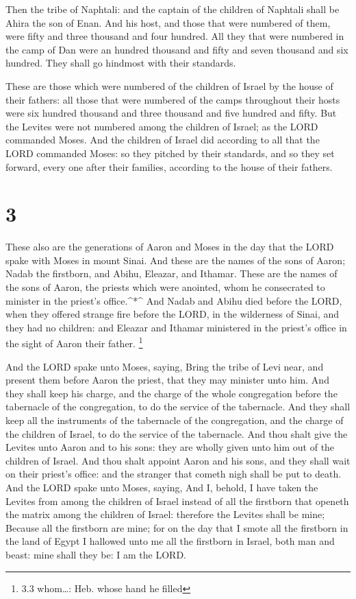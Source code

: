  Then the tribe of Naphtali: and the captain of the
children of Naphtali shall be Ahira the son of Enan.  And
his host, and those that were numbered of them, were fifty and three
thousand and four hundred.  All they that were numbered in
the camp of Dan were an hundred thousand and fifty and seven thousand
and six hundred. They shall go hindmost with their standards.

 These are those which were numbered of the children of
Israel by the house of their fathers: all those that were numbered of
the camps throughout their hosts were six hundred thousand and three
thousand and five hundred and fifty.  But the Levites were
not numbered among the children of Israel; as the LORD commanded Moses.
 And the children of Israel did according to all that the
LORD commanded Moses: so they pitched by their standards, and so they
set forward, every one after their families, according to the house of
their fathers.

\hypertarget{section-2}{%
\section{3}\label{section-2}}

 These also are the generations of Aaron and Moses in the
day that the LORD spake with Moses in mount Sinai.  And
these are the names of the sons of Aaron; Nadab the firstborn, and
Abihu, Eleazar, and Ithamar.  These are the names of the
sons of Aaron, the priests which were anointed, whom he consecrated to
minister in the priest's office.\^{}*\^{}  And Nadab and
Abihu died before the LORD, when they offered strange fire before the
LORD, in the wilderness of Sinai, and they had no children: and Eleazar
and Ithamar ministered in the priest's office in the sight of Aaron
their father. \footnote{3.3 whom\ldots: Heb. whose hand he filled}

 And the LORD spake unto Moses, saying,  Bring
the tribe of Levi near, and present them before Aaron the priest, that
they may minister unto him.  And they shall keep his charge,
and the charge of the whole congregation before the tabernacle of the
congregation, to do the service of the tabernacle.  And they
shall keep all the instruments of the tabernacle of the congregation,
and the charge of the children of Israel, to do the service of the
tabernacle.  And thou shalt give the Levites unto Aaron and
to his sons: they are wholly given unto him out of the children of
Israel.  And thou shalt appoint Aaron and his sons, and
they shall wait on their priest's office: and the stranger that cometh
nigh shall be put to death.  And the LORD spake unto Moses,
saying,  And I, behold, I have taken the Levites from among
the children of Israel instead of all the firstborn that openeth the
matrix among the children of Israel: therefore the Levites shall be
mine;  Because all the firstborn are mine; for on the day
that I smote all the firstborn in the land of Egypt I hallowed unto me
all the firstborn in Israel, both man and beast: mine shall they be: I
am the LORD.

